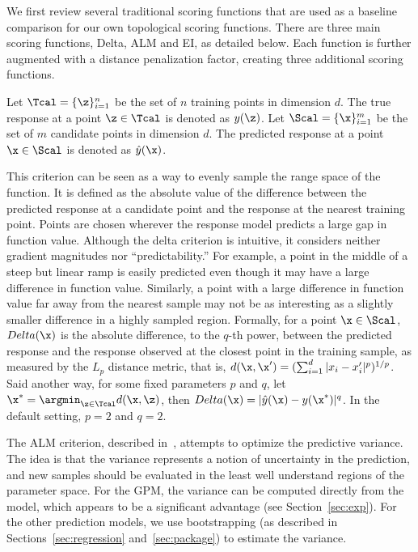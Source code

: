 We first review several traditional scoring functions that are used as a baseline comparison for our own topological scoring functions.
%
There are three main scoring functions, Delta, ALM and EI, as detailed below.
%
Each function is further augmented with a distance penalization factor, creating three additional scoring functions.

Let $\Tcal = \{\z\}_{i=1}^{n}$ be the set of $n$ training points in dimension $d$.
%
The true response at a point $\z \in \Tcal$ is denoted as $y(\z)$.
%
Let $\Scal = \{\x\}_{i=1}^{m}$ be the set of $m$ candidate points in dimension $d$.
%
The predicted response at a point $\x \in \Scal$ is denoted as $\hat{y}(\x)$.

 This criterion can be seen as a way to evenly sample the range space of the function.
%
It is defined as the absolute value of the difference between the predicted response at a candidate point and the response at the nearest training point.
%
Points are chosen wherever the response model predicts a large gap in function value.
%
Although the delta criterion is intuitive, it considers neither gradient magnitudes nor ``predictability.''
%
For example, a point in the middle of a steep but linear ramp is easily predicted even though it may have a large difference in function value.
%
Similarly, a point with a large difference in function value far away from the nearest sample may not be as interesting as a slightly smaller difference in a highly sampled region.
%
Formally, for a point $\x \in \Scal$, $Delta(\x)$ is the absolute difference, to the $q$-th power, between the predicted response and the response observed at the closest point in the training sample, as measured by the $L_p$ distance metric, that is, $d(\x,\x') = (\sum_{i=1}^{d}|x_i-x'_i|^p)^{1/p}$.
%
Said another way, for some fixed parameters $p$ and $q$, let $\x^* = \argmin_{\z \in \Tcal} d(\x,\z)$, then $Delta(\x) = |\hat{y}(\x) - y(\x^*)|^q$.
%
In the default setting, $p = 2$ and $q = 2$.

 The ALM criterion, described in~\cite{MacKay1992}, attempts to optimize the predictive variance.
%
The idea is that the variance represents a notion of uncertainty in the prediction, and new samples should be evaluated in the least well understand regions of the parameter space.
%
For the GPM, the variance can be computed directly from the model, which appears to be a significant advantage (see Section~\ref{sec:exp}).
%
For the other prediction models, we use bootstrapping (as described in Sections~\ref{sec:regression} and~\ref{sec:package}) to estimate the variance.

